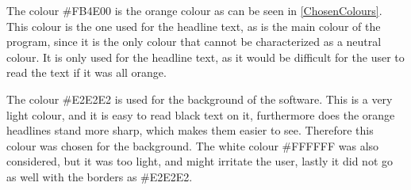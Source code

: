 The colour \#FB4E00 is the orange colour as can be seen in \cref{ChosenColours}. This colour is the one used for the headline text, as is the main colour of the program, since it is the only colour that cannot be characterized as a neutral colour. It is only used for the headline text, as it would be difficult for the user to read the text if it was all orange.

The colour \#E2E2E2 is used for the background of the software. This is a very light colour, and it is easy to read black text on it, furthermore does the orange headlines stand more sharp, which makes them easier to see. Therefore this colour was chosen for the background. The white colour \#FFFFFF was also considered, but it was too light, and might irritate the user, lastly it did not go as well with the borders as \#E2E2E2.


